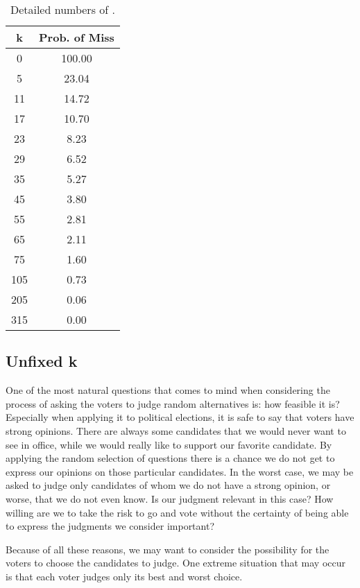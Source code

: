 \documentclass[version=3.21, pagesize, twoside=off, bibliography=totoc, DIV=calc, fontsize=12pt, a4paper]{scrartcl}
\begin{document}
\begin{table}
	\centering
	\begin{tabular}{S[table-figures-integer=3, table-figures-decimal=0]S[table-figures-integer=3, table-figures-decimal=2]}
			\toprule
			{k} & {Prob. of Miss} \\
				&	100.00	\\
			5	&	23.04	\\
			11	&	14.72	\\
			17	&	10.70	\\
			23	&	8.23	\\
			29	&	6.52	\\
			35	&	5.27	\\
			45	&	3.80	\\
			55	&	2.81	\\
			65	&	2.11	\\
			75	&	1.60	\\
			105	&	0.73	\\
			205	&	0.06	\\
			315	&	0.00	\\
			\bottomrule
		\end{tabular}
	\caption{Detailed numbers of .}
	\label{tab:differentK}
\end{table}

\subsection{Unfixed k}

One of the most natural questions that comes to mind when considering the process of asking the voters to judge random alternatives is: how feasible it is? Especially when applying it to political elections, it is safe to say that voters have strong opinions. There are always some candidates that we would never want to see in office, while we would really like to support our favorite candidate. By applying the random selection of questions there is a chance we do not get to express our opinions on those particular candidates. In the worst case, we may be asked to judge only candidates of whom we do not have a strong opinion, or worse, that we do not even know. Is our judgment relevant in this case? How willing are we to take the risk to go and vote without the certainty of being able to express the judgments we consider important?

Because of all these reasons, we may want to consider the possibility for the voters to choose the candidates to judge. One extreme situation that may occur is that each voter judges only its best and worst choice. 
\end{document}
